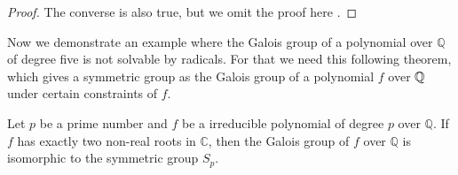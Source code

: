 \begin{proof}
%	
%	
The converse is also true, but we omit the proof here \cite[p.~76]{introduction-to-galois-theory}. 
\end{proof}


Now we demonstrate an example where the Galois group of a polynomial over $\mathbb Q$ of degree five is not solvable by radicals. For that we need this following theorem, which gives a symmetric group as the Galois group of a polynomial $f$ over $\mathbb Q$ under certain constraints of $f$. 

\begin{theorem} \label{thm:galois-iso-symmetric}
	Let $p$ be a prime number and $f$ be a irreducible polynomial of degree $p$ over $\mathbb Q$. If $f$ has exactly two non-real roots in $\mathbb C$, then the Galois group of $f$ over $\mathbb Q$ is isomorphic to the symmetric group $S_p$.
\end{theorem}

